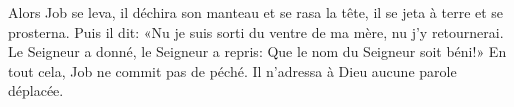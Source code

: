 Alors Job se leva, il déchira son manteau et se rasa la tête,
	il se jeta à terre et se prosterna.
Puis il dit: «Nu je suis sorti du ventre de ma mère, nu j’y retournerai.
	Le Seigneur a donné, le Seigneur a repris: Que le nom du Seigneur soit béni!»
En tout cela, Job ne commit pas de péché.
	Il n’adressa à Dieu aucune parole déplacée.
